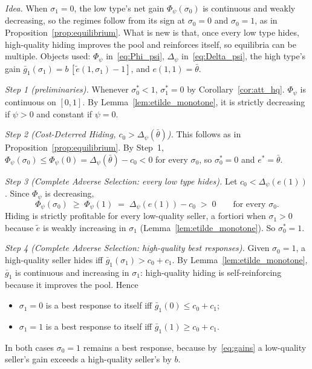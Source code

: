 \upshape
\emph{Idea.} When $\sigma_1=0$, the low type's net gain $\Phi_\psi(\sigma_0)$ is continuous and weakly decreasing, so the regimes follow from its sign at $\sigma_0=0$ and $\sigma_0=1$, as in Proposition~\ref{prop:equilibrium}. What is new is that, once every low type hides, high-quality hiding improves the pool and reinforces itself, so equilibria can be multiple. Objects used: $\Phi_\psi$ in~\eqref{eq:Phi_psi}, $\Delta_\psi$ in~\eqref{eq:Delta_psi}, the high type's gain $\bar g_1(\sigma_1)=b\,[\tilde e(1,\sigma_1)-1]$, and $e(1,1)=\bar\theta$.

\emph{Step 1 (preliminaries).} Whenever $\sigma_0^*<1$, $\sigma_1^*=0$ by Corollary~\ref{cor:att_hq}. $\Phi_\psi$ is continuous on $[0,1]$. By Lemma~\ref{lem:etilde_monotone}, it is strictly decreasing if $\psi>0$ and constant if $\psi=0$.

\emph{Step 2 (Cost-Deterred Hiding, $c_0>\Delta_\psi(\bar\theta)$).} This follows as in Proposition~\ref{prop:equilibrium}. By Step~1, $\Phi_\psi(\sigma_0)\le\Phi_\psi(0)=\Delta_\psi(\bar\theta)-c_0<0$ for every $\sigma_0$, so $\sigma_0^*=0$ and $e^*=\bar\theta$.

\emph{Step 3 (Complete Adverse Selection: every low type hides).} Let $c_0<\Delta_\psi(e(1))$. Since $\Phi_\psi$ is decreasing,
\begin{equation*}
    \Phi_\psi(\sigma_0)\;\ge\;\Phi_\psi(1)\;=\;\Delta_\psi(e(1))-c_0\;>\;0\qquad\text{for every }\sigma_0 .
\end{equation*}
Hiding is strictly profitable for every low-quality seller, a fortiori when $\sigma_1>0$ because $\tilde e$ is weakly increasing in $\sigma_1$ (Lemma~\ref{lem:etilde_monotone}). So $\sigma_0^*=1$.

\emph{Step 4 (Complete Adverse Selection: high-quality best responses).} Given $\sigma_0=1$, a high-quality seller hides iff $\bar g_1(\sigma_1)>c_0+c_1$. By Lemma~\ref{lem:etilde_monotone}, $\bar g_1$ is continuous and increasing in $\sigma_1$: high-quality hiding is self-reinforcing because it improves the pool. Hence
\begin{itemize}
    \item $\sigma_1=0$ is a best response to itself iff $\bar g_1(0)\le c_0+c_1$;
    \item $\sigma_1=1$ is a best response to itself iff $\bar g_1(1)\ge c_0+c_1$.
\end{itemize}
In both cases $\sigma_0=1$ remains a best response, because by~\eqref{eq:gains} a low-quality seller's gain exceeds a high-quality seller's by $b$.

